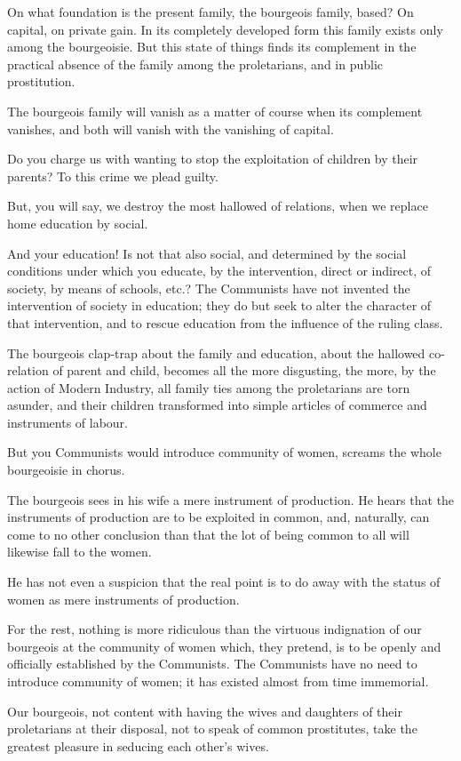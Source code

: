 On what foundation is the present family, the bourgeois family, based?
On capital, on private gain. In its completely developed form this
family exists only among the bourgeoisie. But this state of things
finds its complement in the practical absence of the family among the
proletarians, and in public prostitution.

The bourgeois family will vanish as a matter of course when its
complement vanishes, and both will vanish with the vanishing of
capital.

Do you charge us with wanting to stop the exploitation of children by
their parents? To this crime we plead guilty.

But, you will say, we destroy the most hallowed of relations, when we
replace home education by social.

And your education! Is not that also social, and determined by the
social conditions under which you educate, by the intervention, direct
or indirect, of society, by means of schools, etc.? The Communists have
not invented the intervention of society in education; they do but seek
to alter the character of that intervention, and to rescue education
from the influence of the ruling class.

The bourgeois clap-trap about the family and education, about the
hallowed co-relation of parent and child, becomes all the more
disgusting, the more, by the action of Modern Industry, all family ties
among the proletarians are torn asunder, and their children transformed
into simple articles of commerce and instruments of labour.

But you Communists would introduce community of women, screams the
whole bourgeoisie in chorus.

The bourgeois sees in his wife a mere instrument of production. He
hears that the instruments of production are to be exploited in common,
and, naturally, can come to no other conclusion than that the lot of
being common to all will likewise fall to the women.

He has not even a suspicion that the real point is to do away with the
status of women as mere instruments of production.

For the rest, nothing is more ridiculous than the virtuous indignation
of our bourgeois at the community of women which, they pretend, is to
be openly and officially established by the Communists. The Communists
have no need to introduce community of women; it has existed almost
from time immemorial.

Our bourgeois, not content with having the wives and daughters of their
proletarians at their disposal, not to speak of common prostitutes,
take the greatest pleasure in seducing each other’s wives.

